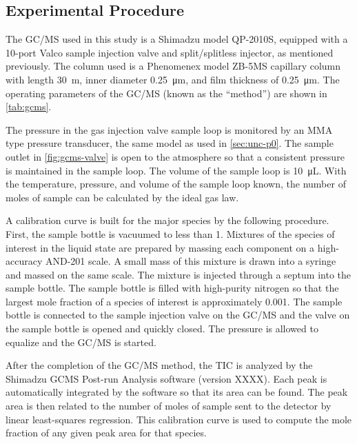 \documentclass[../main.tex]{subfiles}
\begin{document}
\subsection{Experimental Procedure}
\label{sec:gcms-procedure}

The GC/MS used in this study is a
Shimadzu model QP-2010S, equipped with a 10-port Valco sample injection
valve and split/splitless injector, as mentioned previously. The column
used is a Phenomenex model ZB-5MS capillary column
with length \SI{30}{\meter}, inner diameter \SI{0.25}{\micro\meter}, and film
thickness of \SI{0.25}{\micro\meter}. The operating parameters of the GC/MS
(known as the ``method'') are shown in \cref{tab:gcms}.

The pressure in the gas injection valve sample loop is monitored by an
MMA type pressure transducer, the same model as used in \cref{sec:unc-p0}. The
sample outlet in \cref{fig:gcms-valve} is open to the atmosphere
so that a consistent pressure is maintained in the sample loop.
The volume of the sample loop is \SI{10}{\micro\liter}. With
the temperature, pressure, and volume of the sample loop known,
the number of moles of sample can be calculated by the ideal
gas law.

A calibration curve is built for the major species by the
following procedure. First, the sample bottle is vacuumed
to less than \SI{1}{\torr}. Mixtures of the species of
interest in the liquid state are prepared by massing each
component on a high-accuracy AND-201 scale. A small mass
of this mixture is drawn into a syringe and massed on the
same scale. The mixture is injected through a septum into
the sample bottle. The sample bottle is filled with
high-purity nitrogen so that the largest mole fraction of
a species of interest is approximately 0.001. The sample
bottle is connected to the sample injection valve on the
GC/MS and the valve on the sample bottle is opened and
quickly closed. The pressure is allowed to equalize and
the GC/MS is started.

After the completion of the GC/MS method, the TIC is analyzed by the 
Shimadzu GCMS Post-run Analysis software (version XXXX). Each peak is 
automatically integrated by the software so that its area can be found.
The peak area is then related to the number of moles of
sample sent to the detector by linear least-squares regression.
This calibration curve is used to compute the mole fraction
of any given peak area for that species.
\end{document}
